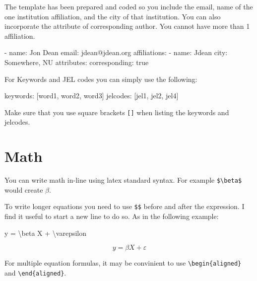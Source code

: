 \documentclass[
  11pts,
]{article}
\newenvironment{Shaded}{\begin{snugshade}}{\end{snugshade}}
\newcommand{\AnnotationTok}[1]{\textcolor[rgb]{0.37,0.37,0.37}{#1}}
\newcommand{\CommentTok}[1]{\textcolor[rgb]{0.37,0.37,0.37}{#1}}
\newcommand{\NormalTok}[1]{\textcolor[rgb]{0.00,0.23,0.31}{#1}}
\newcommand{\SpecialCharTok}[1]{\textcolor[rgb]{0.37,0.37,0.37}{#1}}
\newcommand{\SpecialStringTok}[1]{\textcolor[rgb]{0.13,0.47,0.30}{#1}}
\begin{document}
The template has been prepared and coded so you include the email, name
of the one institution affiliation, and the city of that institution.
You can also incorporate the attribute of corresponding author. You
cannot have more than 1 affiliation.

\begin{Shaded}
\begin{Highlighting}[]
\SpecialStringTok{  {-} }\NormalTok{name: Jon Dean}
\NormalTok{    email: jdean@jdean.org}
\NormalTok{    affiliations: }
\SpecialStringTok{        {-} }\NormalTok{name: Jdean  }
\NormalTok{          city: Somewhere, NU}
\NormalTok{    attributes:}
\NormalTok{        corresponding: true }
\end{Highlighting}
\end{Shaded}

For Keywords and JEL codes you can simply use the following:

\begin{Shaded}
\begin{Highlighting}[]
\AnnotationTok{keywords:}\CommentTok{ [word1, word2, word3]}
\AnnotationTok{jelcodes:}\CommentTok{ [jel1, jel2, jel4]}
\end{Highlighting}
\end{Shaded}

Make sure that you use square brackets \texttt{{[}{]}} when listing the
keywords and jelcodes.

\section{Math}\label{math}

You can write math in-line using latex standard syntax. For example
\texttt{\$\textbackslash{}beta\$} would create \(\beta\).

To write longer equations you need to use \texttt{\$\$} before and after
the expression. I find it useful to start a new line to do so. As in the
following example:

\begin{Shaded}
\begin{Highlighting}[]
\SpecialStringTok{$$y = }\SpecialCharTok{\textbackslash{}beta}\SpecialStringTok{ X + }\SpecialCharTok{\textbackslash{}varepsilon}
\SpecialStringTok{$$}
\end{Highlighting}
\end{Shaded}

\[y = \beta X + \varepsilon
\]

For multiple equation formulas, it may be convinient to use
\texttt{\textbackslash{}begin\{aligned\}} and
\texttt{\textbackslash{}end\{aligned\}}.
\end{document}
